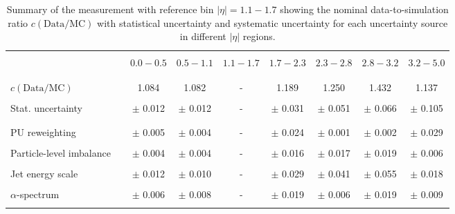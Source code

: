 \begin{table}[!hp]
\centering
\caption{Summary of the measurement with reference bin $|\eta| = 1.1 - 1.7$ showing the nominal data-to-simulation ratio $c\mathrm{(Data/MC)}$ with statistical uncertainty and systematic uncertainty for each uncertainty source in different $|\eta|$ regions.}
\label{tab:syst_uncert_summary_forward_secondnexttocentral}
\begin{tabular}{lcccccccc}
\hline
\hline
 & & & & & & & & \\
 & & $0.0 - 0.5$ & $0.5 - 1.1$ & $1.1 - 1.7$ & $1.7 - 2.3$ & $2.3 - 2.8$ & $2.8 - 3.2$ & $3.2-5.0$ \\
 & & & & & & & & \\
\hline
 & & & & & & & & \\
 $c\mathrm{(Data/MC)}$ & & 1.084 & 1.082 & - & 1.189 & 1.250 & 1.432 & 1.137 \\
 & & & & & & & & \\
 Stat. uncertainty & & $\pm$ 0.012 & $\pm$ 0.012 & - & $\pm$ 0.031 & $\pm$ 0.051 & $\pm$ 0.066 & $\pm$ 0.105 \\
 & & & & & & & & \\
\hline
 & & & & & & & & \\
 PU reweighting & & $\pm$ 0.005 & $\pm$ 0.004 & - & $\pm$ 0.024 & $\pm$ 0.001 & $\pm$ 0.002 & $\pm$ 0.029 \\
 & & & & & & & & \\
 Particle-level imbalance & & $\pm$ 0.004 & $\pm$ 0.004 & - & $\pm$ 0.016 & $\pm$ 0.017 & $\pm$ 0.019 & $\pm$ 0.006 \\
 & & & & & & & & \\
 Jet energy scale & & $\pm$ 0.012 & $\pm$ 0.010 & - & $\pm$ 0.029 & $\pm$ 0.041 & $\pm$ 0.055 & $\pm$ 0.018 \\
 & & & & & & & & \\
 $\alpha$-spectrum & & $\pm$ 0.006 & $\pm$ 0.008 & - & $\pm$ 0.019 & $\pm$ 0.006 & $\pm$ 0.019 & $\pm$ 0.009 \\
 & & & & & & & & \\

\end{tabular}
\end{table}
